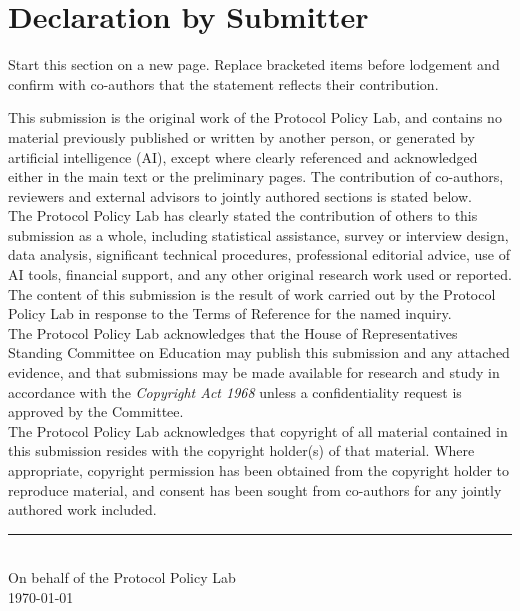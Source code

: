 
\section{Declaration by Submitter}

\begin{instructional}
Start this section on a new page. Replace bracketed items before lodgement and confirm with co-authors that the statement reflects their contribution.
\end{instructional}

\noindent
This submission is the original work of the Protocol Policy Lab, and contains no material previously published or written by another person, or generated by artificial intelligence (AI), except where clearly referenced and acknowledged either in the main text or the preliminary pages. The contribution of co-authors, reviewers and external advisors to jointly authored sections is stated below.\\

\noindent
The Protocol Policy Lab has clearly stated the contribution of others to this submission as a whole, including statistical assistance, survey or interview design, data analysis, significant technical procedures, professional editorial advice, use of AI tools, financial support, and any other original research work used or reported. The content of this submission is the result of work carried out by the Protocol Policy Lab in response to the Terms of Reference for the named inquiry.\\

\noindent
The Protocol Policy Lab acknowledges that the House of Representatives Standing Committee on Education may publish this submission and any attached evidence, and that submissions may be made available for research and study in accordance with the \textit{Copyright Act 1968} unless a confidentiality request is approved by the Committee.\\

\noindent
The Protocol Policy Lab acknowledges that copyright of all material contained in this submission resides with the copyright holder(s) of that material. Where appropriate, copyright permission has been obtained from the copyright holder to reproduce material, and consent has been sought from co-authors for any jointly authored work included.\\

\vspace{2em}
\noindent\rule{6cm}{0.4pt}\\
On behalf of the Protocol Policy Lab\\
\today
